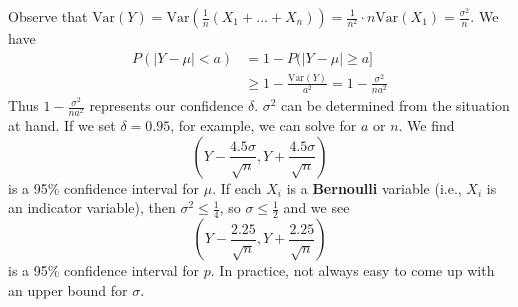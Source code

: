 \documentclass[10pt]{article}
\begin{document}
\begin{multicols}{2}
\begin{enumerate}
\begin{enumerate}
            Observe that $\text{Var}(Y)=\text{Var}(\frac{1}{n}(X_1+\hdots+X_n)) = \frac{1}{n^2} \cdot n \text{Var}(X_1) = \frac{\sigma^2}{n}$. We have
            \begin{align*}
                P(|Y-\mu| < a) &= 1-P(|Y-\mu| \geq a] \\
                &\geq 1 - \frac{\text{Var}(Y)}{a^2}=1-\frac{\sigma^2}{na^2}
            \end{align*}
            Thus $1-\frac{\sigma^2}{na^2}$ represents our confidence $\delta$. $\sigma^2$ can be determined from the situation at hand. If we set $\delta=0.95$, for example, we can solve for $a$ or $n$. We find $$\left(Y-\frac{4.5\sigma}{\sqrt{n}}, Y+\frac{4.5\sigma}{\sqrt{n}}\right)$$ is a 95\% confidence interval for $\mu$. If each $X_i$ is a \textbf{Bernoulli} variable (i.e., $X_i$ is an indicator variable), then $\sigma^2 \leq \frac{1}{4}$, so $\sigma \leq \frac{1}{2}$ and we see $$\left(Y-\frac{2.25}{\sqrt{n}}, Y+\frac{2.25}{\sqrt{n}}\right)$$ is a 95\% confidence interval for $p$. In practice, not always easy to come up with an upper bound for $\sigma$.
        \end{enumerate}
        

\end{enumerate}
\end{multicols}
\end{document}
